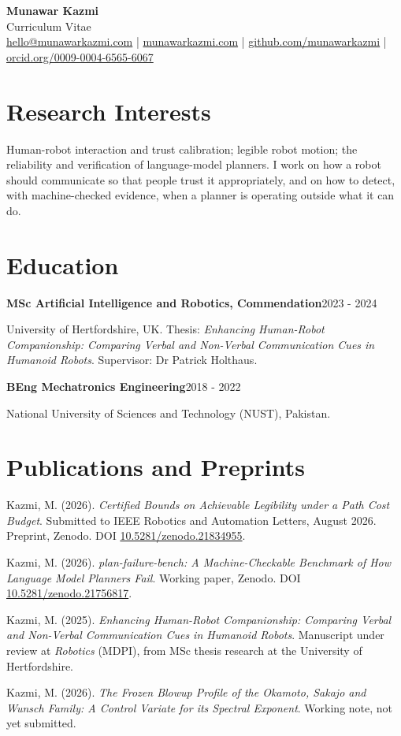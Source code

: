 \documentclass[10pt]{article}
\newcommand{\entry}[2]{{\textbf{#1}\hfill {\small #2}\par}}
\newcommand{\sub}[1]{{\small\color{dim}#1\par}}
\newcommand{\gap}{\vspace{4pt}}
\begin{document}
\begin{center}
{\LARGE\bfseries Munawar Kazmi}\\[2pt]
{\normalsize Curriculum Vitae}\\[3pt]
{\small
\href{mailto:hello@munawarkazmi.com}{hello@munawarkazmi.com} \;|\;
\href{https://munawarkazmi.com}{munawarkazmi.com} \;|\;
\href{https://github.com/munawarkazmi}{github.com/munawarkazmi} \;|\;
\href{https://orcid.org/0009-0004-6565-6067}{orcid.org/0009-0004-6565-6067}}
\end{center}

\section{Research Interests}
Human-robot interaction and trust calibration; legible robot motion; the reliability and verification of
language-model planners. I work on how a robot should communicate so that people trust it appropriately, and on
how to detect, with machine-checked evidence, when a planner is operating outside what it can do.

\section{Education}
\entry{MSc Artificial Intelligence and Robotics, Commendation}{2023 - 2024}
\sub{University of Hertfordshire, UK. Thesis: \emph{Enhancing Human-Robot Companionship: Comparing Verbal and Non-Verbal
Communication Cues in Humanoid Robots}. Supervisor: Dr Patrick Holthaus.}
\gap
\entry{BEng Mechatronics Engineering}{2018 - 2022}
\sub{National University of Sciences and Technology (NUST), Pakistan.}

\section{Publications and Preprints}
{\small
Kazmi, M. (2026). \emph{Certified Bounds on Achievable Legibility under a Path Cost Budget}. Submitted to IEEE Robotics
and Automation Letters, August 2026. Preprint, Zenodo. DOI \href{https://doi.org/10.5281/zenodo.21834955}{10.5281/zenodo.21834955}.\par\gap
Kazmi, M. (2026). \emph{plan-failure-bench: A Machine-Checkable Benchmark of How Language Model Planners Fail}.
Working paper, Zenodo. DOI \href{https://doi.org/10.5281/zenodo.21756817}{10.5281/zenodo.21756817}.\par\gap
Kazmi, M. (2025). \emph{Enhancing Human-Robot Companionship: Comparing Verbal and Non-Verbal Communication Cues in
Humanoid Robots}. Manuscript under review at \emph{Robotics} (MDPI), from MSc thesis research at the University of Hertfordshire.\par\gap
Kazmi, M. (2026). \emph{The Frozen Blowup Profile of the Okamoto, Sakajo and Wunsch Family: A Control Variate for its
Spectral Exponent}. Working note, not yet submitted.}
\end{document}
